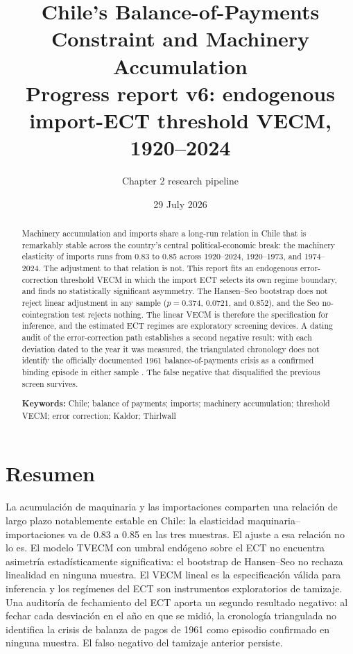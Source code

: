 \documentclass[11pt]{article}
\title{\textbf{Chile's Balance-of-Payments Constraint and Machinery Accumulation}\\
\large Progress report v6: endogenous import-ECT threshold VECM, 1920--2024}
\author{Chapter 2 research pipeline}
\date{29 July 2026}
\begin{document}
\maketitle

\begin{abstract}
Machinery accumulation and imports share a long-run relation in Chile that is remarkably stable across the country's central political-economic break: the machinery elasticity of imports runs from 0.83 to 0.85 across 1920--2024, 1920--1973, and 1974--2024. The adjustment to that relation is not. This report fits an endogenous error-correction threshold VECM in which the import ECT selects its own regime boundary, and finds no statistically significant asymmetry. The Hansen--Seo bootstrap does not reject linear adjustment in any sample ($p=0.374$, $0.0721$, and $0.852$), and the Seo no-cointegration test rejects nothing. The linear VECM is therefore the specification for inference, and the estimated ECT regimes are exploratory screening devices. A dating audit of the error-correction path establishes a second negative result: with each deviation dated to the year it was measured, the triangulated chronology does not identify the officially documented 1961 balance-of-payments crisis as a confirmed binding episode in either sample \citep{bcch2025}. The false negative that disqualified the previous screen survives.

\vspace{0.5em}\noindent\textbf{Keywords:} Chile; balance of payments; imports; machinery accumulation; threshold VECM; error correction; Kaldor; Thirlwall
\end{abstract}

\FloatBarrier
\section*{Resumen}
La acumulación de maquinaria y las importaciones comparten una relación de largo plazo notablemente estable en Chile: la elasticidad maquinaria--importaciones va de 0.83 a 0.85 en las tres muestras. El ajuste a esa relación no lo es. El modelo TVECM con umbral endógeno sobre el ECT no encuentra asimetría estadísticamente significativa: el bootstrap de Hansen--Seo no rechaza linealidad en ninguna muestra. El VECM lineal es la especificación válida para inferencia y los regímenes del ECT son instrumentos exploratorios de tamizaje. Una auditoría de fechamiento del ECT aporta un segundo resultado negativo: al fechar cada desviación en el año en que se midió, la cronología triangulada no identifica la crisis de balanza de pagos de 1961 como episodio confirmado en ninguna muestra. El falso negativo del tamizaje anterior persiste.
\end{document}
